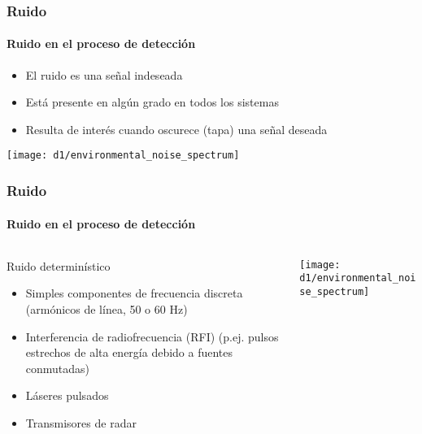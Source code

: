 \documentclass{beamer}
\begin{document}
\begin{frame}
\frametitle{Ruido}
\framesubtitle{Ruido en el proceso de detección}
\begin{itemize}
\item El ruido es una señal indeseada
\item Está presente en algún grado en todos los sistemas
\item Resulta de interés cuando oscurece (tapa) una señal deseada
\end{itemize}
\begin{center}
\texttt{[image: d1/environmental\_noise\_spectrum]}
\end{center}
\end{frame} 

\begin{frame}
\frametitle{Ruido}
\framesubtitle{Ruido en el proceso de detección}
\begin{columns}
\begin{column}{0.5\textwidth}
\begin{block}{Ruido determinístico}
\begin{itemize}
\item Simples componentes de frecuencia discreta (armónicos de línea, 50 o 60 Hz)
\item Interferencia de radiofrecuencia (RFI) (p.ej. pulsos estrechos de alta
energía debido a fuentes conmutadas)
\item Láseres pulsados
\item Transmisores de radar
\end{itemize}
\end{block}
\end{column}
\begin{column}{0.5\textwidth}
\begin{center}
\texttt{[image: d1/environmental\_noise\_spectrum]}
\end{center}
\end{column}
\end{columns}
\end{frame} 
\end{document}
